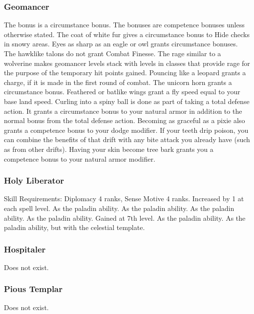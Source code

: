 \subsubsection{Geomancer}
 The bonus is a circumstance bonus.
 The bonuses are competence bonuses unless otherwise stated.
 The coat of white fur gives a  circumstance bonus to Hide checks in snowy areas.
 Eyes as sharp as an eagle or owl grants circumstance bonuses. The hawklike talons do not grant Combat Finesse.
 The rage similar to a wolverine makes geomancer levels stack with levels in classes that provide rage for the purpose of the temporary hit points gained. Pouncing like a leopard grants a charge, if it is made in the first round of combat.
 The unicorn horn grants a circumstance bonus. Feathered or batlike wings grant a fly speed equal to your base land speed. Curling into a spiny ball is done as part of taking a total defense action. It grants a  circumstance bonus to your natural armor in addition to the normal bonus from the total defense action. Becoming as graceful as a pixie also grants a  competence bonus to your dodge modifier. If your teeth drip poison, you can combine the benefits of that drift with any bite attack you already have (such as from other drifts). Having your skin become tree bark grants you a  competence bonus to your natural armor modifier.
\subsubsection{Holy Liberator}
 Skill Requirements: Diplomacy 4 ranks, Sense Motive 4 ranks.
 Increased by 1 at each spell level.
 As the paladin ability.
 As the paladin ability. 
 As the paladin ability.
 As the paladin ability.
 Gained at 7th level. As the paladin ability.
 As the paladin ability, but with the celestial template.
\subsubsection{Hospitaler}
Does not exist.
\subsubsection{Pious Templar}
Does not exist.
